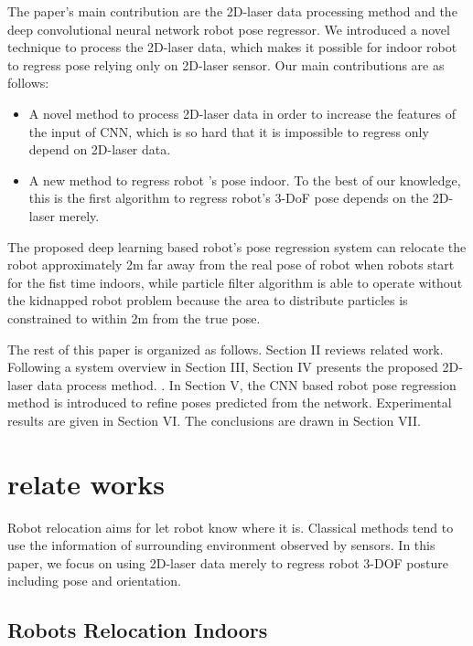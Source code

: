 \documentclass[journal]{IEEEtran}
\begin{document}
The paper's main contribution are the 2D-laser data processing method and the deep convolutional neural network robot pose regressor. We introduced a novel technique to process the 2D-laser data, which makes it possible for indoor robot to regress pose relying only on 2D-laser sensor. Our main contributions are as follows:

\begin{itemize}
	\item  A novel method to process 2D-laser data in order to  increase the features of the input of CNN, which is so hard that it is impossible to regress only depend on 2D-laser data.
	
	\item A new method to regress robot 's pose indoor. To the best of our knowledge, this is the first algorithm to regress robot’s 3-DoF pose depends on the 2D-laser merely.
\end{itemize}

The proposed deep learning based  robot's pose regression system can relocate the robot approximately 2m far away from the real pose of robot when robots start for the fist time indoors, while particle filter algorithm is able to operate without the kidnapped robot problem because the area to distribute particles  is constrained to within 2m from the true pose.

The rest of this paper is organized as follows. Section II reviews related work. Following a system overview in Section III, Section IV presents the proposed 2D-laser data process method.  . In Section V, the CNN based robot pose regression method  is introduced to refine poses predicted from the network. Experimental results are given in Section VI. The conclusions are drawn in Section VII.

 

\section{relate works}

Robot relocation aims for let robot know where it is. Classical methods tend to use the information of surrounding environment observed by sensors. In this paper, we focus on using 2D-laser data merely to regress robot  3-DOF  posture including pose and orientation.

\subsection{Robots Relocation Indoors}
\end{document}
